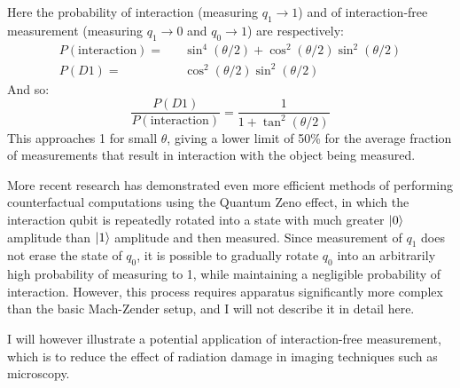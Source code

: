 \documentclass{article}
\begin{document}
Here the probability of interaction (measuring $q_1 \to 1$) and of interaction-free measurement (measuring $q_1 \to 0$ and $q_0 \to 1$) are respectively:
$$\begin{aligned}
P(\text{interaction}) = && \sin^4(\theta/2) + \cos^2(\theta/2)\sin^2(\theta/2)\\
P(D1) = && \cos^2(\theta/2)\sin^2(\theta/2)\end{aligned}$$
And so:
$$\frac{P(D1)}{P(\text{interaction})} = \frac{1}{1 + \tan^2(\theta/2)}$$
This approaches 1 for small $\theta$, giving a lower limit of 50\% for the average fraction of measurements that result in interaction with the object being measured.

More recent research has demonstrated even more efficient methods of performing counterfactual computations using the Quantum Zeno effect, in which the interaction qubit is repeatedly rotated into a state with much greater $\ket 0$ amplitude than $\ket 1$ amplitude and then measured. Since measurement of $q_1$ does not erase the state of $q_0$, it is possible to gradually rotate $q_0$ into an arbitrarily high probability of measuring to 1, while maintaining a negligible probability of interaction. However, this process requires apparatus significantly more complex than the basic Mach-Zender setup, and I will not describe it in detail here.

I will however illustrate a potential application of interaction-free measurement, which is to reduce the effect of radiation damage in imaging techniques such as microscopy.
\end{document}
